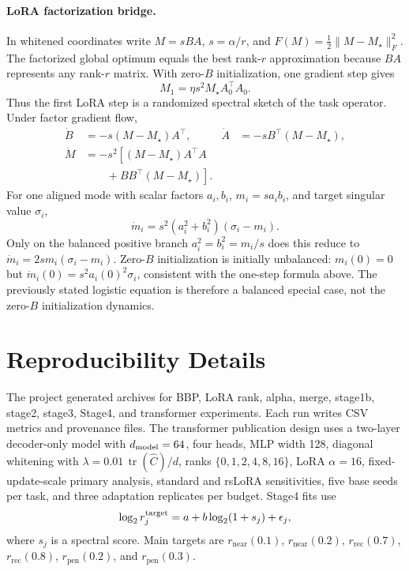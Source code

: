\documentclass[10pt,twocolumn]{article}
\theoremstyle{definition}
\newcommand{\half}{\tfrac12}
\newcommand{\Mstar}{M_\star}
\newcommand{\near}{\mathrm{near}}
\newcommand{\rec}{\mathrm{rec}}
\newcommand{\pen}{\mathrm{pen}}
\begin{document}
\paragraph{LoRA factorization bridge.}
In whitened coordinates write $M=sBA$, $s=\alpha/r$, and $F(M)=\half\|M-\Mstar\|_F^2$.  The factorized global optimum equals the best rank-$r$ approximation because $BA$ represents any rank-$r$ matrix.  With zero-$B$ initialization, one gradient step gives
\begin{equation}
    M_1=\eta s^2\Mstar A_0^\top A_0.
\end{equation}
Thus the first LoRA step is a randomized spectral sketch of the task operator.  Under factor gradient flow,
\begin{align}
    \dot B&=-s(M-\Mstar)A^\top, &
    \dot A&=-sB^\top(M-\Mstar),\\
    \dot M&=-s^2\!\left[(M-\Mstar)A^\top A\right.\\
          &\qquad\left.{}+BB^\top(M-\Mstar)\right].
\end{align}
For one aligned mode with scalar factors $a_i,b_i$, $m_i=sa_ib_i$, and target singular value $\sigma_i$,
\begin{equation}
    \dot m_i=s^2(a_i^2+b_i^2)(\sigma_i-m_i).
\end{equation}
Only on the balanced positive branch $a_i^2=b_i^2=m_i/s$ does this reduce to $\dot m_i=2s m_i(\sigma_i-m_i)$.  Zero-$B$ initialization is initially unbalanced: $m_i(0)=0$ but $\dot m_i(0)=s^2a_i(0)^2\sigma_i$, consistent with the one-step formula above.  The previously stated logistic equation is therefore a balanced special case, not the zero-$B$ initialization dynamics.

\section{Reproducibility Details}
\label{app:reproducibility}

The project generated archives for BBP, LoRA rank, alpha, merge, stage1b, stage2, stage3, Stage4, and transformer experiments.  Each run writes CSV metrics and provenance files.  The transformer publication design uses a two-layer decoder-only model with $d_{\rm model}=64$, four heads, MLP width 128, diagonal whitening with $\lambda=0.01\,\operatorname{tr}(\widehat C)/d$, ranks $\{0,1,2,4,8,16\}$, LoRA $\alpha=16$, fixed-update-scale primary analysis, standard and rsLoRA sensitivities, five base seeds per task, and three adaptation replicates per budget.  Stage4 fits use
\begin{equation}
    \log_2 r_j^{\rm target}=a+b\log_2(1+s_j)+\epsilon_j,
\end{equation}
where $s_j$ is a spectral score.  Main targets are $r_{\near}(0.1)$, $r_{\near}(0.2)$, $r_{\rec}(0.7)$, $r_{\rec}(0.8)$, $r_{\pen}(0.2)$, and $r_{\pen}(0.3)$.
\end{document}
